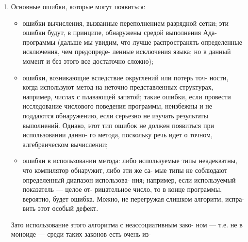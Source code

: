 \begin{enumerate}
\item Основные ошибки, которые могут появиться:
\begin{itemize}
\item ошибки вычисления, вызванные переполнением разрядной\linebreak
сетки; эти ошибки будут, в принципе, обнаружены средой\linebreak
выполнения Ада-программы (дальше мы увидим, что лучше\linebreak
распространять определенные исключения, чем предопреде­-\linebreak
ленные исключения языка; но в данный момент и без этого\linebreak
все достаточно сложно);
\item ошибки, возникающие вследствие округлений или потерь точ­-\linebreak
ности, когда используют метод на неточно представленных\linebreak
структурах, например, числах с плавающей запятой; такие\linebreak
ошибки, если провести исследование числового поведения\linebreak
программы, неизбежны и не поддаются обнаружению, если\linebreak
серьезно не изучать результаты выполнений. Однако, этот\linebreak
тип ошибок не должен появиться при использовании данно­-\linebreak
го метода, поскольку речь идет о точном, алгебраическом\linebreak
вычислении;
\item ошибки в использовании метода: либо используемые типы\linebreak
неадекватны, что компилятор обнаружит, либо эти же са­-\linebreak
мые типы не соблюдают определенный диапазон использова­-\linebreak
ния; например, если используемый показатель — целое от­-\linebreak
рицательное число, то в конце программы, вероятно, будет\linebreak
ошибка. Можно, не перегружая слишком алгоритм, испра­-\linebreak
вить этот особый дефект.
\end{itemize}
Зато использование этого алгоритма с неассоциативным зако­-\linebreak
ном — т.е. не в моноиде — среди таких законов есть очень из­-\linebreak

\end{enumerate}
